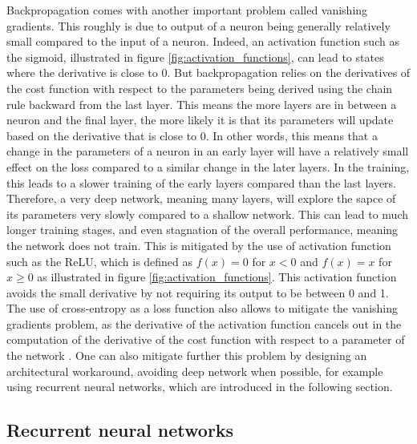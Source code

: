 Backpropagation comes with another important problem called vanishing gradients. This roughly is due to output of a neuron being generally relatively small compared to the input of a neuron. Indeed, an activation function such as the sigmoid, illustrated in figure \ref{fig:activation_functions}, can lead to states where the derivative is close to 0. But backpropagation relies on the derivatives of the cost function with respect to the parameters being derived using the chain rule backward from the last layer. This means the more layers are in between a neuron and the final layer, the more likely it is that its parameters will update based on the derivative that is close to 0. In other words, this means that a change in the parameters of a neuron in an early layer will have a relatively small effect on the loss compared to a similar change in the later layers. In the training, this leads to a slower training of the early layers compared than the last layers. Therefore, a very deep network, meaning many layers, will explore the sapce of its parameters very slowly compared to a shallow network. This can lead to much longer training stages, and even stagnation of the overall performance, meaning the network does not train. This is mitigated by the use of activation function such as the ReLU, which is defined as $f(x)=0$ for $x < 0$ and $f(x)=x$ for $x \geq 0$ as illustrated in figure \ref{fig:activation_functions}. This activation function avoids the small derivative by not requiring its output to be between 0 and 1. The use of cross-entropy as a loss function also allows to mitigate the vanishing gradients problem, as the derivative of the activation function cancels out in the computation of the derivative of the cost function with respect to a parameter of the network \cite{NN_book}. One can also mitigate further this problem by designing an architectural workaround, avoiding deep network when possible, for example using recurrent neural networks, which are introduced in the following section.



\subsection{Recurrent neural networks}

